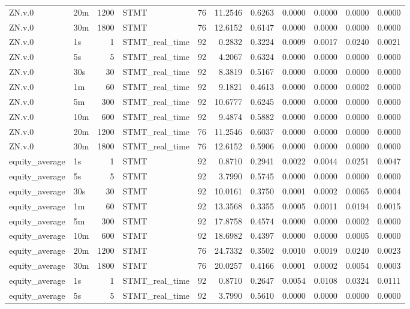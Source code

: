 \begin{tabular}{llrlrrrrrrr}
ZN.v.0 & 20m & 1200 & STMT & 76 & 11.2546 & 0.6263 & 0.0000 & 0.0000 & 0.0000 & 0.0000 \\
ZN.v.0 & 30m & 1800 & STMT & 76 & 12.6152 & 0.6147 & 0.0000 & 0.0000 & 0.0000 & 0.0000 \\
ZN.v.0 & 1s & 1 & STMT_real_time & 92 & 0.2832 & 0.3224 & 0.0009 & 0.0017 & 0.0240 & 0.0021 \\
ZN.v.0 & 5s & 5 & STMT_real_time & 92 & 4.2067 & 0.6324 & 0.0000 & 0.0000 & 0.0000 & 0.0000 \\
ZN.v.0 & 30s & 30 & STMT_real_time & 92 & 8.3819 & 0.5167 & 0.0000 & 0.0000 & 0.0000 & 0.0000 \\
ZN.v.0 & 1m & 60 & STMT_real_time & 92 & 9.1821 & 0.4613 & 0.0000 & 0.0000 & 0.0002 & 0.0000 \\
ZN.v.0 & 5m & 300 & STMT_real_time & 92 & 10.6777 & 0.6245 & 0.0000 & 0.0000 & 0.0000 & 0.0000 \\
ZN.v.0 & 10m & 600 & STMT_real_time & 92 & 9.4874 & 0.5882 & 0.0000 & 0.0000 & 0.0000 & 0.0000 \\
ZN.v.0 & 20m & 1200 & STMT_real_time & 76 & 11.2546 & 0.6037 & 0.0000 & 0.0000 & 0.0000 & 0.0000 \\
ZN.v.0 & 30m & 1800 & STMT_real_time & 76 & 12.6152 & 0.5906 & 0.0000 & 0.0000 & 0.0000 & 0.0000 \\
equity_average & 1s & 1 & STMT & 92 & 0.8710 & 0.2941 & 0.0022 & 0.0044 & 0.0251 & 0.0047 \\
equity_average & 5s & 5 & STMT & 92 & 3.7990 & 0.5745 & 0.0000 & 0.0000 & 0.0000 & 0.0000 \\
equity_average & 30s & 30 & STMT & 92 & 10.0161 & 0.3750 & 0.0001 & 0.0002 & 0.0065 & 0.0004 \\
equity_average & 1m & 60 & STMT & 92 & 13.3568 & 0.3355 & 0.0005 & 0.0011 & 0.0194 & 0.0015 \\
equity_average & 5m & 300 & STMT & 92 & 17.8758 & 0.4574 & 0.0000 & 0.0000 & 0.0002 & 0.0000 \\
equity_average & 10m & 600 & STMT & 92 & 18.6982 & 0.4397 & 0.0000 & 0.0000 & 0.0005 & 0.0000 \\
equity_average & 20m & 1200 & STMT & 76 & 24.7332 & 0.3502 & 0.0010 & 0.0019 & 0.0240 & 0.0023 \\
equity_average & 30m & 1800 & STMT & 76 & 20.0257 & 0.4166 & 0.0001 & 0.0002 & 0.0054 & 0.0003 \\
equity_average & 1s & 1 & STMT_real_time & 92 & 0.8710 & 0.2647 & 0.0054 & 0.0108 & 0.0324 & 0.0111 \\
equity_average & 5s & 5 & STMT_real_time & 92 & 3.7990 & 0.5610 & 0.0000 & 0.0000 & 0.0000 & 0.0000 \\

\end{tabular}
